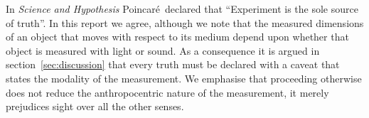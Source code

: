 \documentclass[10pt, fleqn,final,showtrims,oldfontcommands, article,a4paper,oneside]{memoir} %
\newcommand{\secref}[1]{section~\ref{sec:#1}}
\newcommand{\aetherial}{\ae therial}
\newcommand{\Poincare}{Poincar{\'e}}
\begin{document}
In {\em Science and Hypothesis}\cite{Poincare1902} \Poincare\ declared that ``Experiment is the sole source of truth''.
In this report we agree, although we note that  the measured dimensions of an object that moves with respect to its medium   depend upon whether
that object is measured with light or sound.
As a consequence it is argued in \secref{discussion} that   every truth  must be declared  with a caveat that states the modality of the measurement.
We emphasise that  proceeding otherwise does not reduce the anthropocentric nature of the measurement, 
it merely prejudices sight over all the other senses.





\end{document}
